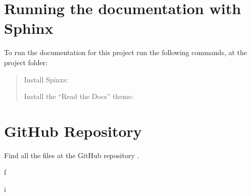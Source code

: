 \documentclass[letterpaper,10pt,english,openany,oneside]{sphinxmanual}
\begin{document}
\section{Running the documentation with Sphinx}
\label{\detokenize{index:running-the-documentation-with-sphinx}}
To run the documentation for this project run the following commands, at the project folder:
\begin{quote}

Install Spinxs:


Install the “Read the Docs” theme:



\end{quote}


\section{GitHub Repository}
\label{\detokenize{index:github-repository}}
Find all the files at the GitHub repository .


\renewcommand{\indexname}{Python Module Index}
\begin{sphinxtheindex}
\def\bigletter#1{{\Large\sffamily#1}\nopagebreak\vspace{1mm}}
\bigletter{f}
\item {}
\indexspace
\bigletter{i}
\item {}
\end{sphinxtheindex}

\renewcommand{\indexname}{Index}
\printindex
\end{document}
